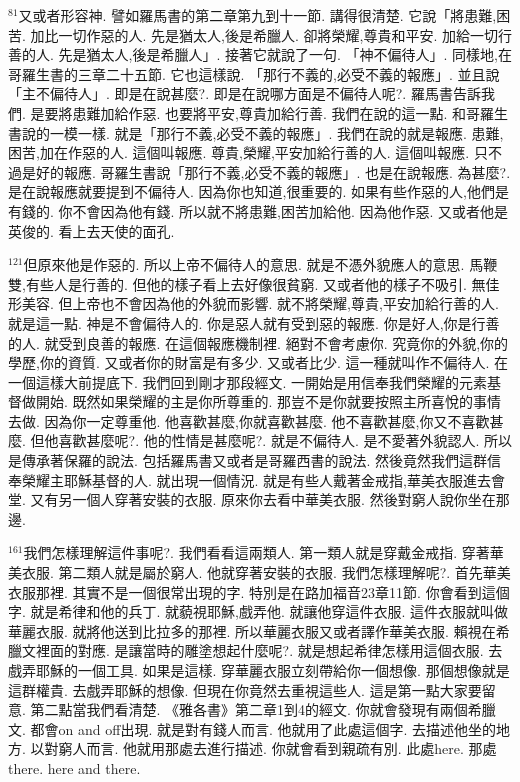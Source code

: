 \documentclass{book}
\begin{document}
$^{81}$又或者形容神.
譬如羅馬書的第二章第九到十一節.
講得很清楚.
它說「將患難,困苦.
加比一切作惡的人.
先是猶太人,後是希臘人.
卻將榮耀,尊貴和平安.
加給一切行善的人.
先是猶太人,後是希臘人」.
接著它就說了一句.
「神不偏待人」.
同樣地,在哥羅生書的三章二十五節.
它也這樣說.
「那行不義的,必受不義的報應」.
並且說「主不偏待人」.
即是在說甚麼?.
即是在說哪方面是不偏待人呢?.
羅馬書告訴我們.
是要將患難加給作惡.
也要將平安,尊貴加給行善.
我們在說的這一點.
和哥羅生書說的一模一樣.
就是「那行不義,必受不義的報應」.
我們在說的就是報應.
患難,困苦,加在作惡的人.
這個叫報應.
尊貴,榮耀,平安加給行善的人.
這個叫報應.
只不過是好的報應.
哥羅生書說「那行不義,必受不義的報應」.
也是在說報應.
為甚麼?.
是在說報應就要提到不偏待人.
因為你也知道,很重要的.
如果有些作惡的人,他們是有錢的.
你不會因為他有錢.
所以就不將患難,困苦加給他.
因為他作惡.
又或者他是英俊的.
看上去天使的面孔.

$^{121}$但原來他是作惡的.
所以上帝不偏待人的意思.
就是不憑外貌應人的意思.
馬鞭雙,有些人是行善的.
但他的樣子看上去好像很貧窮.
又或者他的樣子不吸引.
無佳形美容.
但上帝也不會因為他的外貌而影響.
就不將榮耀,尊貴,平安加給行善的人.
就是這一點.
神是不會偏待人的.
你是惡人就有受到惡的報應.
你是好人,你是行善的人.
就受到良善的報應.
在這個報應機制裡.
絕對不會考慮你.
究竟你的外貌,你的學歷,你的資質.
又或者你的財富是有多少.
又或者比少.
這一種就叫作不偏待人.
在一個這樣大前提底下.
我們回到剛才那段經文.
一開始是用信奉我們榮耀的元素基督做開始.
既然如果榮耀的主是你所尊重的.
那豈不是你就要按照主所喜悅的事情去做.
因為你一定尊重他.
他喜歡甚麼,你就喜歡甚麼.
他不喜歡甚麼,你又不喜歡甚麼.
但他喜歡甚麼呢?.
他的性情是甚麼呢?.
就是不偏待人.
是不愛著外貌認人.
所以是傳承著保羅的說法.
包括羅馬書又或者是哥羅西書的說法.
然後竟然我們這群信奉榮耀主耶穌基督的人.
就出現一個情況.
就是有些人戴著金戒指,華美衣服進去會堂.
又有另一個人穿著安裝的衣服.
原來你去看中華美衣服.
然後對窮人說你坐在那邊.

$^{161}$我們怎樣理解這件事呢?.
我們看看這兩類人.
第一類人就是穿戴金戒指.
穿著華美衣服.
第二類人就是屬於窮人.
他就穿著安裝的衣服.
我們怎樣理解呢?.
首先華美衣服那裡.
其實不是一個很常出現的字.
特別是在路加福音23章11節.
你會看到這個字.
就是希律和他的兵丁.
就藐視耶穌,戲弄他.
就讓他穿這件衣服.
這件衣服就叫做華麗衣服.
就將他送到比拉多的那裡.
所以華麗衣服又或者譯作華美衣服.
賴視在希臘文裡面的對應.
是讓當時的雕塗想起什麼呢?.
就是想起希律怎樣用這個衣服.
去戲弄耶穌的一個工具.
如果是這樣.
穿華麗衣服立刻帶給你一個想像.
那個想像就是這群權貴.
去戲弄耶穌的想像.
但現在你竟然去重視這些人.
這是第一點大家要留意.
第二點當我們看清楚.
《雅各書》第二章1到4的經文.
你就會發現有兩個希臘文.
都會on and off出現.
就是對有錢人而言.
他就用了此處這個字.
去描述他坐的地方.
以對窮人而言.
他就用那處去進行描述.
你就會看到親疏有別.
此處here.
那處there.
here and there.
\end{document}
